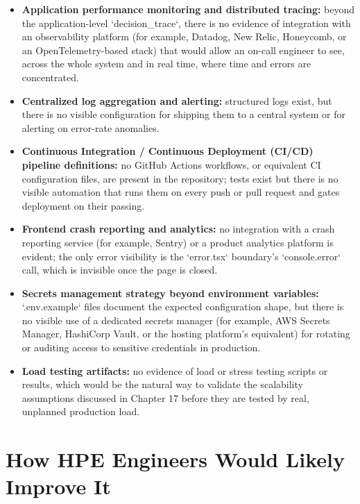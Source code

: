 \documentclass[11pt,a4paper]{report}
\begin{document}
\begin{itemize}[leftmargin=*]
  \item \textbf{Application performance monitoring and distributed tracing:} beyond the application-level `decision\_trace`, there is no evidence of integration with an observability platform (for example, Datadog, New Relic, Honeycomb, or an OpenTelemetry-based stack) that would allow an on-call engineer to see, across the whole system and in real time, where time and errors are concentrated.
  \item \textbf{Centralized log aggregation and alerting:} structured logs exist, but there is no visible configuration for shipping them to a central system or for alerting on error-rate anomalies.
  \item \textbf{Continuous Integration / Continuous Deployment (CI/CD) pipeline definitions:} no GitHub Actions workflows, or equivalent CI configuration files, are present in the repository; tests exist but there is no visible automation that runs them on every push or pull request and gates deployment on their passing.
  \item \textbf{Frontend crash reporting and analytics:} no integration with a crash reporting service (for example, Sentry) or a product analytics platform is evident; the only error visibility is the `error.tsx` boundary's `console.error` call, which is invisible once the page is closed.
  \item \textbf{Secrets management strategy beyond environment variables:} `.env.example` files document the expected configuration shape, but there is no visible use of a dedicated secrets manager (for example, AWS Secrets Manager, HashiCorp Vault, or the hosting platform's equivalent) for rotating or auditing access to sensitive credentials in production.
  \item \textbf{Load testing artifacts:} no evidence of load or stress testing scripts or results, which would be the natural way to validate the scalability assumptions discussed in Chapter 17 before they are tested by real, unplanned production load.
\end{itemize}

\section{How HPE Engineers Would Likely Improve It}
\end{document}
